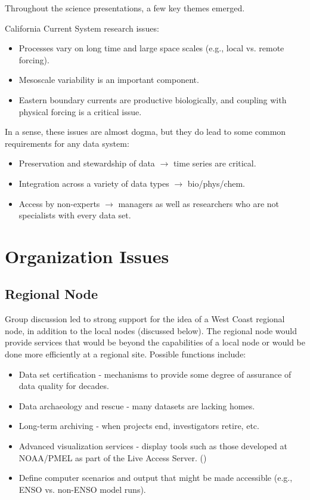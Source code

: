 Throughout the science presentations, a few key themes emerged.

California Current System research issues:
\begin{itemize}
\item Processes vary on long time and large space scales (e.g., local
  vs. remote forcing).
\item Mesoscale variability is an important component.
\item Eastern boundary currents are productive biologically, and
  coupling with physical forcing is a critical issue.
\end{itemize}

In a sense, these issues are almost dogma, but they do lead to some common 
requirements for any data system:
\begin{itemize}
\item Preservation and stewardship of data $\rightarrow$ time series are critical.
\item Integration across a variety of data types $\rightarrow$ bio/phys/chem.
\item Access by non-experts $\rightarrow$ managers as well as researchers who
  are not specialists with every data set.
\end{itemize}

\section{Organization Issues}

\subsection{Regional Node}

Group discussion led to strong support for the idea of a West Coast
regional node, in addition to the local nodes (discussed below).  The
regional node would provide services that would be beyond the
capabilities of a local node or would be done more efficiently at a
regional site.  Possible functions include:
\begin{itemize}
\item Data set certification - mechanisms to provide some degree of
  assurance of data quality for decades.
\item Data archaeology and rescue - many datasets are lacking homes.
\item Long-term archiving - when projects end, investigators retire, etc.
\item Advanced visualization services - display tools such as those
  developed at NOAA/PMEL as part of the Live Access Server.
  ()
\item Define computer scenarios and output that might be made
  accessible (e.g., ENSO vs.  non-ENSO model runs).
\end{itemize}

